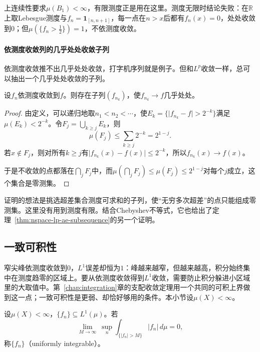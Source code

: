 上连续性要求$\mu(B_1)<\infty$，有限测度正是用在这里。测度无限时结论失败：在$\mathbb R$上取Lebesgue测度与$f_n=\mathbf 1_{[n,n+1]}$，每一点在$n>x$后都有$f_n(x)=0$，处处收敛到$0$；但$\mu(\{f_n>\tfrac12\})=1$，不依测度收敛。

\paragraph{依测度收敛列的几乎处处收敛子列}
依测度收敛推不出几乎处处收敛，打字机序列就是例子。但和$L^p$收敛一样，总可以抽出一个几乎处处收敛的子列。

\begin{theorem}[依测度收敛的子列]
\label{thm:nspace-measure-subsequence}
设$f_n$依测度收敛到$f$。则存在子列$(f_{n_k})$，使$f_{n_k}\to f$几乎处处。
\end{theorem}

\begin{proof}
由定义，可以递归地取$n_1<n_2<\cdots$，使$E_k=\{\lvert f_{n_k}-f\rvert>2^{-k}\}$满足$\mu(E_k)<2^{-k}$。令$F_j=\bigcup_{k\geq j}E_k$，则
\[
 \mu(F_j)\leq\sum_{k\geq j}2^{-k}=2^{1-j}.
\]
若$x\notin F_j$，则对所有$k\geq j$有$\lvert f_{n_k}(x)-f(x)\rvert\leq2^{-k}$，所以$f_{n_k}(x)\to f(x)$。

于是不收敛的点都落在$\bigcap_jF_j$中，而$\mu(\bigcap_jF_j)\leq\mu(F_j)\leq2^{1-j}$对每个$j$成立，这个集合是零测集。
\end{proof}

证明的想法是挑选超差集合测度可求和的子列，使“无穷多次超差”的点只能组成零测集。这里没有用到测度有限。结合Chebyshev不等式，它也给出了定理~\ref{thm:nspace-lp-ae-subsequence}的另一个证明。

\subsection{一致可积性}
\label{sec:nspace-uniform-integrability}

窄尖峰依测度收敛到$0$，$L^1$误差却恒为$1$：峰越来越窄，但越来越高，积分始终集中在测度趋零的区域上。要从依测度收敛得到$L^1$收敛，需要防止积分躲进小区域里的大取值中。第~\ref{chap:integration}章的支配收敛定理用一个共同的可积上界做到这一点；一致可积性是更弱、却恰好够用的条件。本小节设$\mu(X)<\infty$。

\begin{definition}[一致可积]
\label{def:nspace-uniform-integrability}
设$\mu(X)<\infty$，$\{f_n\}\subseteq L^1(\mu)$。若
\begin{equation}
 \lim_{M\to\infty}\ \sup_{n}\int_{\{\lvert f_n\rvert>M\}}\lvert f_n\rvert\,d\mu=0,
 \label{eq:nspace-uniform-integrability}
\end{equation}
称$\{f_n\}$（uniformly integrable）。
\end{definition}

